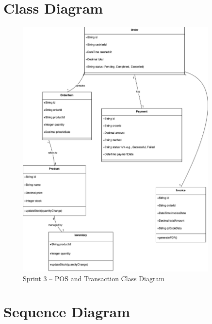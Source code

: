\section{Class Diagram}

\begin{figure}[H]
  \centering
  \includegraphics[width=0.9\textwidth]{figures/images/sprint3class.png}
  \caption{Sprint 3 – POS and Transaction Class Diagram}
  \label{fig:sprint3-class}
\end{figure}

\section{Sequence Diagram}

